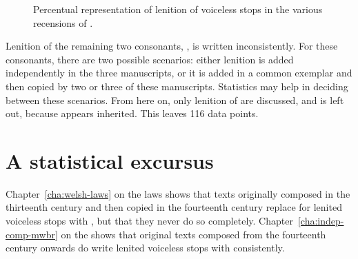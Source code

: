 \begin{figure}[h]
    \centering
  \caption{Percentual representation of lenition of voiceless stops in the various recensions of .}
  \label{fig:barchartdewi}
  \end{figure}



Lenition of the remaining two consonants, , is written inconsistently. For these consonants, there are two possible scenarios: either lenition is added independently in the three manuscripts, or it is added in a common exemplar and then copied by two or three of these manuscripts. Statistics may help in deciding between these scenarios.
From here on, only lenition of  are discussed, and  is left out, because  appears inherited. This leaves 116 data points.

\section{A statistical excursus}
\label{sec:statistical-excursus}

Chapter~\ref{cha:welsh-laws} on the laws shows that texts originally composed in the thirteenth century and then copied in the fourteenth century replace  for lenited voiceless stops with , but that they never do so completely. Chapter~\ref{cha:indep-comp-mwbr} on the  shows that original texts composed from the fourteenth century onwards do write lenited voiceless stops with  consistently.

